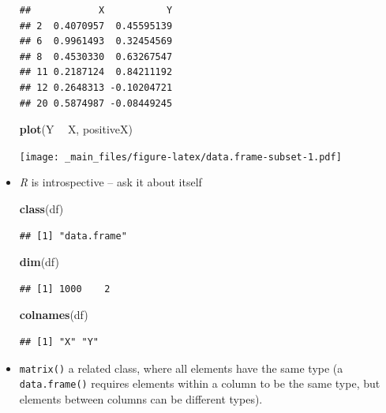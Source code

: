 \documentclass[]{article}
\newenvironment{Shaded}{\begin{snugshade}}{\end{snugshade}}
\newcommand{\KeywordTok}[1]{\textcolor[rgb]{0.13,0.29,0.53}{\textbf{#1}}}
\newcommand{\DecValTok}[1]{\textcolor[rgb]{0.00,0.00,0.81}{#1}}
\newcommand{\StringTok}[1]{\textcolor[rgb]{0.31,0.60,0.02}{#1}}
\newcommand{\OperatorTok}[1]{\textcolor[rgb]{0.81,0.36,0.00}{\textbf{#1}}}
\newcommand{\NormalTok}[1]{#1}
\theoremstyle{definition}
\theoremstyle{definition}
\theoremstyle{remark}
\begin{document}
\begin{itemize}
\begin{Shaded}
\end{Shaded}

\begin{verbatim}
##            X           Y
## 2  0.4070957  0.45595139
## 6  0.9961493  0.32454569
## 8  0.4530330  0.63267547
## 11 0.2187124  0.84211192
## 12 0.2648313 -0.10204721
## 20 0.5874987 -0.08449245
\end{verbatim}

\begin{Shaded}
\begin{Highlighting}[]
\KeywordTok{plot}\NormalTok{(Y }\OperatorTok{~}\StringTok{ }\NormalTok{X, positiveX)}
\end{Highlighting}
\end{Shaded}

  \texttt{[image: \_main\_files/figure-latex/data.frame-subset-1.pdf]}
\item
  \emph{R} is introspective -- ask it about itself

\begin{Shaded}
\begin{Highlighting}[]
\KeywordTok{class}\NormalTok{(df)}
\end{Highlighting}
\end{Shaded}

\begin{verbatim}
## [1] "data.frame"
\end{verbatim}

\begin{Shaded}
\begin{Highlighting}[]
\KeywordTok{dim}\NormalTok{(df)}
\end{Highlighting}
\end{Shaded}

\begin{verbatim}
## [1] 1000    2
\end{verbatim}

\begin{Shaded}
\begin{Highlighting}[]
\KeywordTok{colnames}\NormalTok{(df)}
\end{Highlighting}
\end{Shaded}

\begin{verbatim}
## [1] "X" "Y"
\end{verbatim}
\item
  \texttt{matrix()} a related class, where all elements have the same
  type (a \texttt{data.frame()} requires elements within a column to be
  the same type, but elements between columns can be different types).
\end{itemize}
\end{document}
